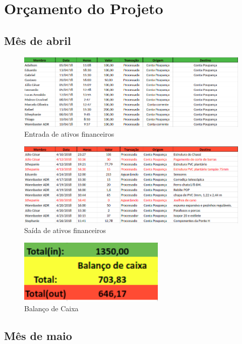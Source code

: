 \chapter[Orçamento do Projeto]{Orçamento do Projeto}

\section{Mês de abril}
\begin{figure}[!htb]
	\centering
	\includegraphics[width=17cm]{figuras/entrada_ativos.png}
	\caption{Entrada de ativos financeiros} \label{entrada_ativos}
\end{figure}

\begin{figure}[!htb]
	\centering
	\includegraphics[width=17cm]{figuras/saida_ativos.png}
	\caption{Saída de ativos financeiros} \label{saida_ativos}
\end{figure}

\begin{figure}[!htb]
	\centering
	\includegraphics[width=7cm]{figuras/balanco_abril.png}
	\caption{Balanço de Caixa} \label{balanco_abril}
\end{figure}

\section{Mês de maio}

